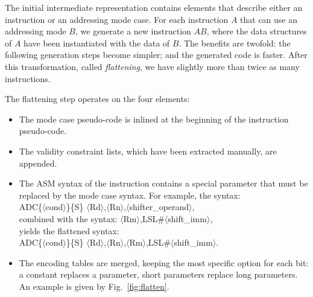 \documentclass[conference]{ieeeconf}
\begin{document}
The initial intermediate representation contains elements that describe either
an instruction or an addressing mode case. For each instruction $A$ that can
use an addressing mode $B$, we generate a new instruction $AB$, where the data
structures of $A$ have been instantiated with the data of $B$. The benefits are
twofold: the following generation steps become simpler; and the generated code
is faster. After this transformation, called {\em flattening}, we have slightly
more than twice as many instructions.

The flattening step operates on the four elements:
\begin{itemize}
\item The mode case pseudo-code is inlined at the beginning of the instruction
  pseudo-code.
\item The validity constraint lists, which have been extracted manually, are
  appended.
\item The ASM syntax of the instruction contains a special parameter that must
  be replaced by the mode case syntax. For example, the syntax: \\
  {\stt ADC\{$\langle$cond$\rangle$\}\{S\}
    $\langle$Rd$\rangle$,$\langle$Rn$\rangle$,$\langle$shifter\_operand$\rangle$},\\
  combined with the syntax: {\stt $\langle$Rm$\rangle$,LSL\#$\langle$shift\_imm$\rangle$},\\
  yields the flattened syntax:\\
  {\stt ADC\{$\langle$cond$\rangle$\}\{S\}
    $\langle$Rd$\rangle$,$\langle$Rn$\rangle$,$\langle$Rm$\rangle$,LSL\#$\langle$shift\_imm$\rangle$}.
\item The encoding tables are merged, keeping the most specific option for each
  bit: a constant replaces a parameter, short parameters replace long
  parameters. An example is given by Fig.~\ref{fig:flatten}.
\end{itemize}
\end{document}
